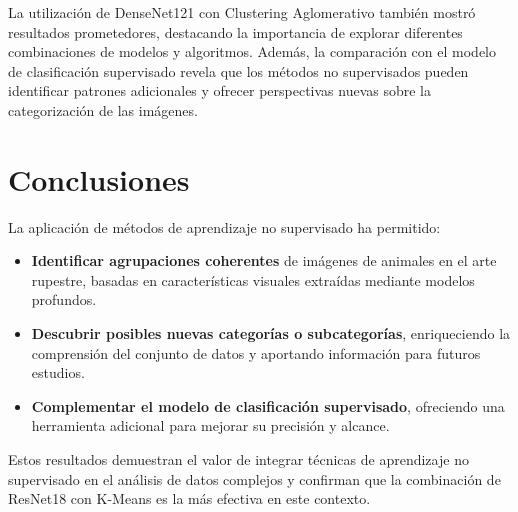 La utilización de DenseNet121 con Clustering Aglomerativo también mostró resultados prometedores, destacando la importancia de explorar diferentes combinaciones de modelos y algoritmos.
Además, la comparación con el modelo de clasificación supervisado revela que los métodos no supervisados pueden identificar patrones adicionales y ofrecer perspectivas nuevas sobre la categorización de las imágenes.

\section{Conclusiones}

La aplicación de métodos de aprendizaje no supervisado ha permitido:

\begin{itemize}
    \item \textbf{Identificar agrupaciones coherentes} de imágenes de animales en el arte rupestre, basadas en características visuales extraídas mediante modelos profundos.
    \item \textbf{Descubrir posibles nuevas categorías o subcategorías}, enriqueciendo la comprensión del conjunto de datos y aportando información para futuros estudios.
    \item \textbf{Complementar el modelo de clasificación supervisado}, ofreciendo una herramienta adicional para mejorar su precisión y alcance.
\end{itemize}

Estos resultados demuestran el valor de integrar técnicas de aprendizaje no supervisado en el análisis de datos complejos y confirman que la combinación de ResNet18 con K-Means es la más efectiva en este contexto.